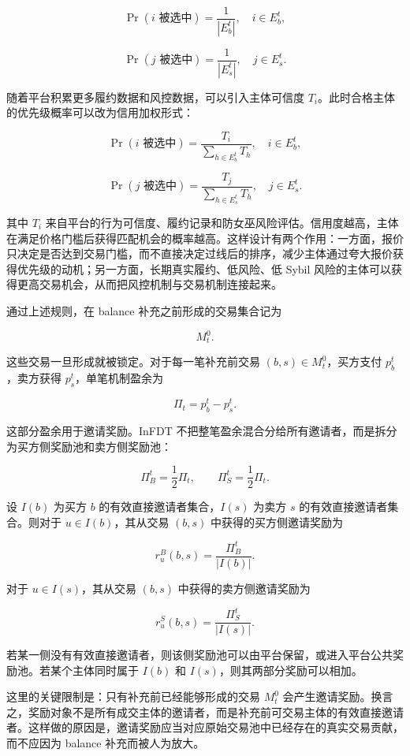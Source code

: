 \documentclass[UTF8,11pt]{ctexart}
\begin{document}
\[
    \Pr(i\text{ 被选中})=\frac{1}{|E_b^t|},\quad i\in E_b^t,
\]

\[
    \Pr(j\text{ 被选中})=\frac{1}{|E_s^t|},\quad j\in E_s^t.
\]

随着平台积累更多履约数据和风控数据，可以引入主体可信度 \(T_i\)。此时合格主体的优先级概率可以改为信用加权形式：

\[
    \Pr(i\text{ 被选中})=
    \frac{T_i}{\sum_{h\in E_b^t}T_h},
    \quad i\in E_b^t,
\]

\[
    \Pr(j\text{ 被选中})=
    \frac{T_j}{\sum_{h\in E_s^t}T_h},
    \quad j\in E_s^t.
\]

其中 \(T_i\) 来自平台的行为可信度、履约记录和防女巫风险评估。信用度越高，主体在满足价格门槛后获得匹配机会的概率越高。这样设计有两个作用：一方面，报价只决定是否达到交易门槛，而不直接决定过线后的排序，减少主体通过夸大报价获得优先级的动机；另一方面，长期真实履约、低风险、低 Sybil 风险的主体可以获得更高交易机会，从而把风控机制与交易机制连接起来。

通过上述规则，在 balance 补充之前形成的交易集合记为

\[
    M_t^0.
\]

这些交易一旦形成就被锁定。对于每一笔补充前交易 \((b,s)\in M_t^0\)，买方支付 \(p_b^t\)，卖方获得 \(p_s^t\)，单笔机制盈余为

\[
    \Pi_t=p_b^t-p_s^t.
\]

这部分盈余用于邀请奖励。InFDT 不把整笔盈余混合分给所有邀请者，而是拆分为买方侧奖励池和卖方侧奖励池：

\[
    \Pi_B^t=\frac{1}{2}\Pi_t,\qquad
    \Pi_S^t=\frac{1}{2}\Pi_t.
\]

设 \(I(b)\) 为买方 \(b\) 的有效直接邀请者集合，\(I(s)\) 为卖方 \(s\) 的有效直接邀请者集合。则对于 \(u\in I(b)\)，其从交易 \((b,s)\) 中获得的买方侧邀请奖励为

\[
    r_u^B(b,s)=\frac{\Pi_B^t}{|I(b)|}.
\]

对于 \(u\in I(s)\)，其从交易 \((b,s)\) 中获得的卖方侧邀请奖励为

\[
    r_u^S(b,s)=\frac{\Pi_S^t}{|I(s)|}.
\]

若某一侧没有有效直接邀请者，则该侧奖励池可以由平台保留，或进入平台公共奖励池。若某个主体同时属于 \(I(b)\) 和 \(I(s)\)，则其两部分奖励可以相加。

这里的关键限制是：只有补充前已经能够形成的交易 \(M_t^0\) 会产生邀请奖励。换言之，奖励对象不是所有成交主体的邀请者，而是补充前可交易主体的有效直接邀请者。这样做的原因是，邀请奖励应当对应原始交易池中已经存在的真实交易贡献，而不应因为 balance 补充而被人为放大。
\end{document}
